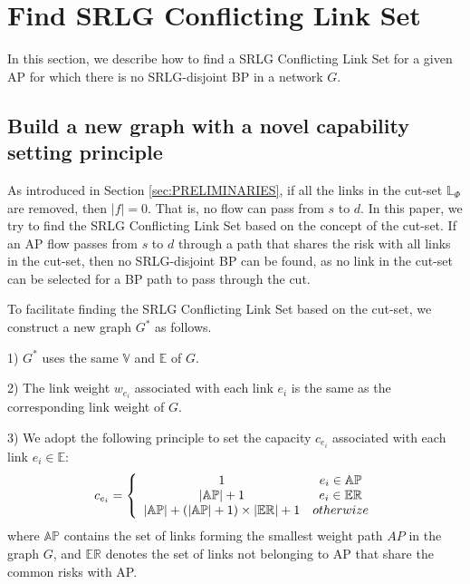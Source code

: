 \section{Find SRLG Conflicting Link Set}
\label{sec:Find SRLG conflict link set}
In this section, we describe how to find a SRLG Conflicting Link Set for a given AP for which there is no SRLG-disjoint BP in a
 network $G$.

\subsection{Build a new graph with a novel capability setting principle}


As introduced in Section \ref{sec:PRELIMINARIES},  if all the links in the cut-set $\mathbb{\mathbb{L}}_{\Phi}$ are removed, then $|f| = 0$. That is, no flow can pass from $s$ to $d$. In this paper,  we try to find the SRLG Conflicting Link Set based on the concept of the cut-set. If an AP flow passes from $s$ to $d$ through a path that shares the risk with  all links in the cut-set, then no SRLG-disjoint BP can be found, as no link in the cut-set can be selected for a BP path to pass through the cut.



To facilitate finding the SRLG Conflicting Link Set based on the cut-set, we construct a new graph $G^*$ as follows.

1) $G^*$ uses the same ${\mathbb{V}}$ and ${\mathbb{E}}$ of $G$.

2) The link weight $w_{e_i}$ associated with each link $e_i$ is the same as the corresponding link weight of $G$.

3) We adopt the following principle to set the capacity $c_{e_i}$ associated with each link $e_i \in \mathbb{E}$:
  \begin{equation}
c_{e_i} = \left\{ {\begin{array}{*{20}{c}}
   1 & {e_i{\rm{ }} \in {\rm{ \mathbb{AP}}}}  \\
   {\left| \mathbb{AP} \right|+1} & {e_i{\rm{ }} \in {\rm{ \mathbb{E}}}{{\rm{\mathbb{R}}}}}  \\
   {\left| {{\rm\mathbb{AP}}} \right| + \left( {\left| {{\rm\mathbb{AP}}} \right| + 1} \right)\times \left| {{\rm{\mathbb{E}}}{{\rm{\mathbb{R}}}}} \right| + 1} & {otherwize}  \\
\end{array}} \right.
\label{eq:capacity principle}
\end{equation}
where $\mathbb{AP}$ contains the set of links forming the smallest weight path $AP$ in the graph $G$,  and $\mathbb{\mathbb{ER}}$ denotes the set of links not belonging to AP that share the common risks with AP.

